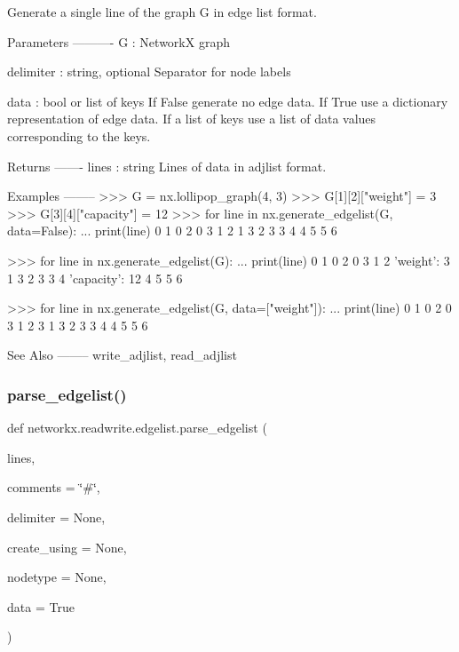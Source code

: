 \begin{DoxyVerb}Generate a single line of the graph G in edge list format.

Parameters
----------
G : NetworkX graph

delimiter : string, optional
   Separator for node labels

data : bool or list of keys
   If False generate no edge data.  If True use a dictionary
   representation of edge data.  If a list of keys use a list of data
   values corresponding to the keys.

Returns
-------
lines : string
    Lines of data in adjlist format.

Examples
--------
>>> G = nx.lollipop_graph(4, 3)
>>> G[1][2]["weight"] = 3
>>> G[3][4]["capacity"] = 12
>>> for line in nx.generate_edgelist(G, data=False):
...     print(line)
0 1
0 2
0 3
1 2
1 3
2 3
3 4
4 5
5 6

>>> for line in nx.generate_edgelist(G):
...     print(line)
0 1 {}
0 2 {}
0 3 {}
1 2 {'weight': 3}
1 3 {}
2 3 {}
3 4 {'capacity': 12}
4 5 {}
5 6 {}

>>> for line in nx.generate_edgelist(G, data=["weight"]):
...     print(line)
0 1
0 2
0 3
1 2 3
1 3
2 3
3 4
4 5
5 6

See Also
--------
write_adjlist, read_adjlist
\end{DoxyVerb}
 \mbox{\label{namespacenetworkx_1_1readwrite_1_1edgelist_a53a72911992f02c936d1f3250f8e7d87}} 
\subsubsection{\texorpdfstring{parse\+\_\+edgelist()}{parse\_edgelist()}}
{\footnotesize\ttfamily def networkx.\+readwrite.\+edgelist.\+parse\+\_\+edgelist (\begin{DoxyParamCaption}\item[{}]{lines,  }\item[{}]{comments = {\ttfamily \char`\"{}\#\char`\"{}},  }\item[{}]{delimiter = {\ttfamily None},  }\item[{}]{create\+\_\+using = {\ttfamily None},  }\item[{}]{nodetype = {\ttfamily None},  }\item[{}]{data = {\ttfamily True} }\end{DoxyParamCaption})}


